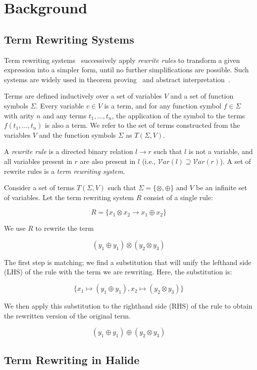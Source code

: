 \documentclass[sigplan,review,anonymous]{acmart}\settopmatter{printfolios=true,printccs=false,printacmref=false}
\begin{document}
\section{Background}
\subsection{Term Rewriting Systems}
Term rewriting systems~\cite{gorn1967} successively apply \textit{rewrite rules} to transform a given
expression into a simpler form, until no further simplifications are possible.  Such systems are widely
used in theorem proving~\cite{} and abstract interpretation~\cite{}.

Terms are defined inductively over a set of variables $V$ and a set of function symbols $\Sigma$. Every variable $v \in V$ is a term, and for any function symbol $f \in \Sigma$ with arity $n$ and any terms $t_1, ..., t_n$, the application of the symbol to the terms $f(t_1, ..., t_n)$ is also a term. We refer to the set of terms constructed from the variables $V$ and the function symbols $\Sigma$ as $T(\Sigma, V)$.

A \emph{rewrite rule} is a directed binary relation $l \rightarrow r$ such that $l$ is not a variable, and all variables present in $r$ are also present in $l$ (i.e., $\mathcal{V}ar(l) \supseteq \mathcal{V}ar(r)$). A set of rewrite rules is a \emph{term rewriting system}.

Consider a set of terms $T(\Sigma, V)$ such that $\Sigma = \{\otimes, \oplus\}$ and $V$ be an infinite set of variables. Let the term rewriting system $R$ consist of a single rule:

\[ R = \{ x_1 \otimes x_2 \rightarrow x_1 \oplus x_2 \} \]

We use $R$ to rewrite the term

\[ 
(y_1 \oplus y_1) \otimes (y_2 \otimes y_3)
\]

The first step is matching; we find a substitution that will unify the lefthand side (LHS) of the rule with the term we are rewriting. Here, the substitution is:

\[
\{ x_1 \mapsto (y_1 \oplus y_1), x_2 \mapsto (y_2 \otimes y_3) \}
\]

We then apply this substitution to the righthand side (RHS) of the rule to obtain the rewritten version of the original term.

\[ 
(y_1 \oplus y_1) \oplus (y_2 \otimes y_3)
\]

\subsection{Term Rewriting in Halide}
\end{document}
